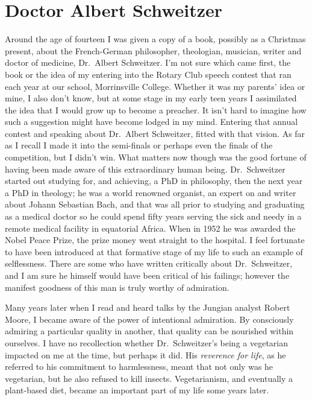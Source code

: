 \chapter{Doctor Albert Schweitzer}

Around the age of fourteen I was given a copy of a book, possibly as a
Christmas present, about the French-German philosopher, theologian,
musician, writer and doctor of medicine, Dr.~Albert Schweitzer\cite{schweitzer}.
I'm not sure which came first, the book or
the idea of my entering into the Rotary Club speech contest that ran
each year at our school, Morrinsville College. Whether it was my
parents' idea or mine, I also don't know, but at some stage in my early
teen years I assimilated the idea that I would grow up to become a
preacher. It isn't hard to imagine how such a suggestion might have
become lodged in my mind. Entering that annual contest and speaking
about Dr.~Albert Schweitzer, fitted with that vision. As far as I recall
I made it into the semi-finals or perhaps even the finals of the
competition, but I didn't win. What matters now though was the good
fortune of having been made aware of this extraordinary human being.
Dr.~Schweitzer started out studying for, and achieving, a PhD in philosophy,
then the next year a PhD in theology; he was a world renowned organist,
an expert on and writer about Johann Sebastian Bach, and that was all
prior to studying and graduating as a medical doctor so he could spend
fifty years serving the sick and needy in a remote medical facility in
equatorial Africa. When in 1952 he was awarded the Nobel Peace Prize,
the prize money went straight to the hospital. I feel fortunate to have
been introduced at that formative stage of my life to such an example of
selflessness. There are some who have written critically about
Dr.~Schweitzer, and I am sure he himself would have been critical of his
failings; however the manifest goodness of this man is truly worthy of
admiration.

Many years later when I read and heard talks by the Jungian analyst
Robert Moore, I became aware of the power of intentional admiration. By
consciously admiring a particular quality in another, that quality can
be nourished within ourselves. I have no recollection whether
Dr.~Schweitzer's being a vegetarian impacted on me at the time, but perhaps
it did. His \emph{reverence for life}, as he referred to his commitment
to harmlessness, meant that not only was he vegetarian, but he also
refused to kill insects.
Vegetarianism, and eventually a plant-based diet,
became an important part of my life some years later.

